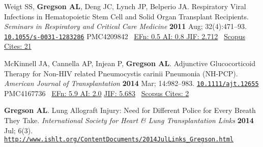 \documentclass[letterpaper,11pt,sans,final]{moderncv}%
\begin{document}
\begin{thebibliography}{1}
  \bibitem[4]{} Weigt SS, \textbf{Gregson AL}, Deng JC, Lynch JP, Belperio JA. Respiratory Viral Infections in Hematopoietic Stem Cell and Solid Organ Transplant Recipients. {\color{BrickRed}\textit{Seminars in Respiratory and Critical Care Medicine}} \textbf{2011} Aug; 32(4):471--93. \href{http://dx.doi.org/10.1055/s-0031-1283286}{\nolinkurl{10.1055/s-0031-1283286}} {\smaller PMC4209842}~ 
    {\color{NavyBlue} \href{http://www.eigenfactor.org/rankings.php?search=SEMINARS+IN+RESPIRATORY+AND+CRITICAL+CARE+MEDICINE&search2=&search3=&searchby=journal}{{\smaller EFn: 0.5 AI: 0.8 JIF: 2.712}}~
      \href{http://www.scopus.com/record/display.uri?eid=2-s2.0-80051960857&origin=resultslist&sort=plf-f&src=s&nlo=1&nlr=20&nls=&sid=4E3F003C86CD3B740CA1877B02032D8B.y7ESLndDIsN8cE7qwvy6w%3a3832&sot=anl&sdt=aut&sl=36&s=AU-ID%28%22Gregson%2c+Aric+L.%22+6603096521%29&relpos=10&citeCnt=21&searchTerm=AU-ID%28%5C%26quot%3BGregson%2C+Aric+L.%5C%26quot%3B+6603096521%29}{{\smaller Scopus Cites: 21}}
      }

  \bibitem[5]{} McKinnell JA, Cannella AP, Injean P, \textbf{Gregson AL}. Adjunctive Glucocorticoid Therapy for Non-{\smaller HIV} related Pneumocystis carinii Pneumonia ({\smaller NH-PCP}).
{\color{BrickRed}\textit{American Journal of Transplantation}} \textbf{2014} Mar; 14:982--983. \href{http://dx.doi.org/10.1111/ajt.12655}{\nolinkurl{10.1111/ajt.12655}} {\smaller PMC4167736}~
       {\color{NavyBlue}\href{http://52.6.43.8/projects/journalRank/rankings.php?bsearch=AMERICAN+JOURNAL+OF+TRANSPLANTATION&searchby=journal&orderby=eigenfactor}{{\smaller EFn: 5.9 AI: 2.0}} 
       \href{http://admin-apps.webofknowledge.com/JCR/JCR?RQ=RECORD&rank=1&journal=AM+J+TRANSPLANT}{{\smaller JIF: 5.683}}~
       \href{http://www.scopus.com/record/display.uri?eid=2-s2.0-84897116000&origin=resultslist&sort=plf-f&src=s&st1=&st2=&nlo=1&nlr=20&nls=&sid=4E3F003C86CD3B740CA1877B02032D8B.y7ESLndDIsN8cE7qwvy6w%3a2832&sot=anl&sdt=aut&sl=36&s=AU-ID%28%22Gregson%2c+Aric+L.%22+6603096521%29&relpos=4&citeCnt=2&searchTerm=AU-ID%28%5C%26quot%3BGregson%2C+Aric+L.%5C%26quot%3B+6603096521%29}{{\smaller Scopus Cites: 2}}
       }

  \bibitem[6]{} \textbf{Gregson AL}. Lung Allograft Injury: Need for Different Police for Every Breath They Take.
{\color{BrickRed}\textit{International Society for Heart \& Lung Transplantation Links}} \textbf{2014} Jul; 6(3). \href{http://www.ishlt.org/ContentDocuments/2014JulLinks_Gregson.html}{\nolinkurl{http://www.ishlt.org/ContentDocuments/2014JulLinks_Gregson.html}}



\end{thebibliography}
\closesection{}
\end{document}

